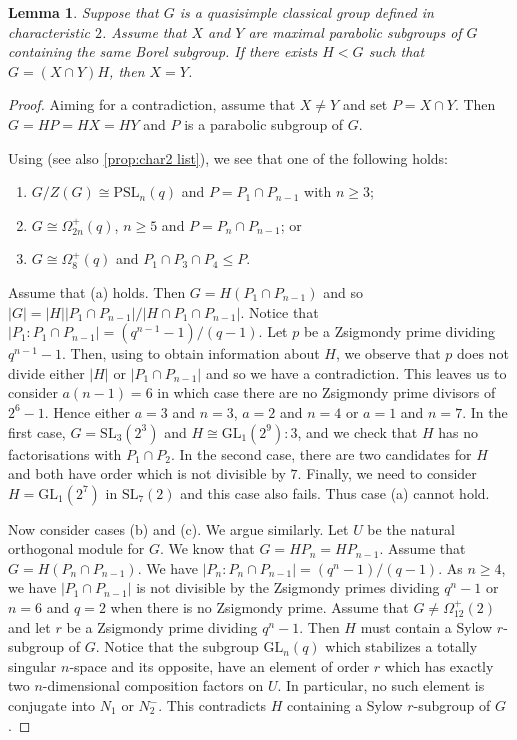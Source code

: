 \documentclass[12pt]{amsart}
\newtheorem{lemma}[theorem]{Lemma}
\theoremstyle{remark}
\theoremstyle{notation}
\theoremstyle{definition}
\newcommand{\GL}{\mathrm{GL}}
\newcommand{\SL}{\mathrm{SL}}
\newcommand{\0}{\emptyset}
\newcommand{\PSL}{\mathrm{PSL}}
\begin{document}
\begin{lemma}\label{lem:unique para}
Suppose that $G$ is a quasisimple classical group defined in characteristic $2$. Assume that $X$ and $Y$ are maximal parabolic subgroups of $G$ containing the same Borel subgroup. If there exists $H < G$ such that $G= (X\cap Y)H$, then $X=Y$.
\end{lemma}

\begin{proof}
Aiming for a contradiction, assume that $X\ne Y$ and set $P=X \cap Y$.  Then $G=HP=HX=HY$ and $P$ is a parabolic subgroup of $G$.

 Using \cite[Theorem A, Tables 1, 2 3 \& 4]{LiebeckPraegerSaxl} (see also \cref{prop:char2 list}), we see that one of the following holds:
\begin{enumerate}
\item[(a)] $G/Z(G) \cong \PSL_n(q)$ and $P =P_1\cap P_{n-1}$ with $n \ge 3$;
\item[(b)] $G \cong \Omega_{2n}^+(q)$, $n \ge 5$ and $P= P_{n}\cap P_{n-1}$; or
\item[(c)] $G\cong \Omega_8^+(q)$ and $P_1\cap P_3\cap P_4 \le P$.
\end{enumerate}


Assume that (a) holds.
Then $G=H(P_1\cap P_{n-1})$ and so $|G|= |H||P_1\cap P_{n-1}|/|H\cap P_1\cap P_{n-1}|$. Notice that $|P_1:P_1\cap P_{{n-1}}|= (q^{n-1}-1)/(q-1)$. Let $p $ be a Zsigmondy prime dividing $q^{n-1}-1$. Then, using \cite[Theorem A, Tables 1, 2 3 \& 4]{LiebeckPraegerSaxl} to obtain information about $H$, we observe that $p$ does not divide  either $|H|$ or $|P_1\cap P_{n-1}|$ and so we have a contradiction. This leaves us to consider $a(n-1)= 6$ in which case there are no Zsigmondy prime divisors of $2^6-1$.  Hence either $a=3$ and $n= 3$, $a=2$ and $n=4$ or $a=1$ and $n=7$. In the first case, $G=\SL_3(2^3)$  and $H\cong \GL_1(2^9):3$, and we check that $H$ has no factorisations with $P_1\cap P_2$. In the second case,  there are two candidates for $H$ and both have order which is not divisible by $7$. Finally, we need to consider $H=\GL_1(2^7)$ in $\SL_7(2)$ and this case also fails. Thus   case (a) cannot hold.

Now consider cases (b) and (c). We argue similarly. Let $U$ be the natural orthogonal module for $G$. We know that  $G=HP_n= HP_{n-1}$. Assume that $G=H(P_n\cap P_{n-1})$.
We have $|P_n:P_n\cap P_{n-1}|= (q^n-1)/(q-1)$.
As $n\ge 4$, we have $|P_1\cap P_{n-1}|$ is not divisible by the Zsigmondy primes dividing $q^n-1$ or $n=6$ and $q=2$ when there is no Zsigmondy prime. Assume that $G \ne \Omega_{12}^+(2)$ and let  $r$ be  a Zsigmondy prime dividing $q^n-1$. Then $H$ must contain a Sylow $r$-subgroup of $G$.  Notice that the subgroup $\GL_n(q)$ which stabilizes a totally singular $n$-space and its opposite, have an element of order $r$ which has exactly two $n$-dimensional composition factors on $U$.  In particular, no such element is conjugate into $N_1$ or $N_2^-$. This contradicts $H$ containing a Sylow $r$-subgroup of $G$.


\end{proof}
\end{document}

